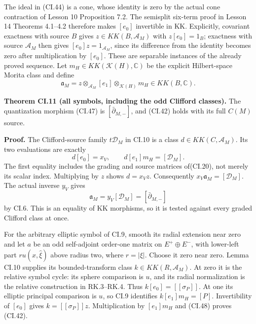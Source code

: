 \documentclass[
  11pt,
]{article}
\begin{document}
The ideal in (CI.44) is a cone, whose identity is zero by the actual
cone contraction of Lesson 10 Proposition 7.2. The semisplit six-term
proof in Lesson 14 Theorems 4.1--4.2 therefore makes \([e_0]\)
invertible in KK. Explicitly, covariant exactness with source \(B\)
gives \(z\in KK(B,\mathcal A_M)\) with \(z[e_0]=1_B\); exactness with
source \(\mathcal A_M\) then gives \([e_0]z=1_{\mathcal A_M}\), since
its difference from the identity becomes zero after multiplication by
\([e_0]\). These are separable instances of the already proved sequence.
Let \(m_H\in KK(\mathcal K(H),\mathbb C)\) be the explicit Hilbert-space
Morita class and define \[
 \mathfrak a_M=z\otimes_{\mathcal A_M}[e_1]
                       \otimes_{\mathcal K(H)}m_H\in KK(B,\mathbb C).
 \tag{CI.47}
\]

\textbf{Theorem CI.11 (all symbols, including the odd Clifford
classes).} The quantization morphism (CI.47) is
\([\bar\partial_{M,-}]\), and (CI.42) holds with its full \(C(M)\)
source.

\textbf{Proof.} The Clifford-source family \(t\mathscr D_M\) in CI.10 is
a class \(d\in KK(C,\mathcal A_M)\). Its two evaluations are exactly \[
 d[e_0]=x_V,
 \qquad d[e_1]m_H=[\mathscr D_M].
\] The first equality includes the grading and source matrices
of(CI.20), not merely its scalar index. Multiplying by \(z\) shows
\(d=x_Vz\). Consequently \(x_V\mathfrak a_M=[\mathscr D_M]\). The actual
inverse \(y_V\) gives \[
 \mathfrak a_M=y_V[\mathscr D_M]
                     =[\bar\partial_{M,-}]
 \tag{CI.48}
\] by CI.6. This is an equality of KK morphisms, so it is tested against
every graded Clifford class at once.

For the arbitrary elliptic symbol of CI.9, smooth its radial extension
near zero and let \(a\) be an odd self-adjoint order-one matrix on
\(E^+\oplus E^-\), with lower-left part \(r u(x,\widehat\xi)\) above
radius two, where \(r=|\xi|\). Choose it zero near zero. Lemma CI.10
supplies its bounded-transform class \(k\in KK(R,\mathcal A_M)\). At
zero it is the relative symbol cycle: its sphere comparison is \(u\),
and its radial normalization is the relative construction in RK.3--RK.4.
Thus \(k[e_0]=[\![\sigma_P]\!]\). At one its elliptic principal
comparison is \(u\), so CI.9 identifies \(k[e_1]m_H=[P]\). Invertibility
of \([e_0]\) gives \(k=[\![\sigma_P]\!]z\). Multiplication by
\([e_1]m_H\) and (CI.48) proves (CI.42).
\end{document}

